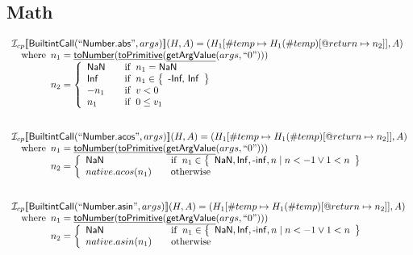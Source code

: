 \documentclass{article}
\newcommand{\SF}[1]{\mbox{\textsf{#1}}}
\newcommand{\wherec}[1]{{\rm where}\begin{array}[t]{l}#1\end{array}}
\newcommand{\ifc}[1]{{\rm if}\begin{array}[t]{l}#1\end{array}}
\newcommand{\owc}{{\rm otherwise}}
\newcommand{\I}{\mathcal{I}}
\newcommand{\set}[1]{\left\{\begin{array}{l}#1\end{array}\right\}}
\newcommand{\lbr}{\llbracket}
\newcommand{\rbr}{\rrbracket}
\newcommand{\hf}[1]{\underline{\sf #1}}
\begin{document}
\subsection{Math}
\[
\begin{array}{l}

\I _{cp}\lbr \SF{BuiltintCall}(``\SF{Number.abs}",args)\rbr(H,A)
  = (H_1[\#temp \mapsto H_1(\#temp)[@return \mapsto n_2]], A)\\
\quad\wherec{
  n_1 = \hf{toNumber}(\hf{toPrimitive}(\hf{getArgValue}(args, ``0")))\\
  n_2 = \left\{
    \begin{array}{l@{\quad\quad}l}
      \SF{NaN} & \ifc{n_1=\SF{NaN}} \\
      \SF{Inf} & \ifc{n_1\in\set{\SF{-Inf, Inf}}} \\
      -n_1 & \ifc{v<0} \\
      n_1 & \ifc{0\leq v_1} \\
    \end{array}
  \right.
  }\\
\\\\


\I _{cp}\lbr \SF{BuiltintCall}(``\SF{Number.acos}",args)\rbr(H,A)
  = (H_1[\#temp \mapsto H_1(\#temp)[@return \mapsto n_2]], A)\\
\quad\wherec{
  n_1 = \hf{toNumber}(\hf{toPrimitive}(\hf{getArgValue}(args, ``0")))\\
  n_2 = \left\{
    \begin{array}{l@{\quad\quad}l}
      \SF{NaN} & \ifc{n_1 \in \set{\SF{NaN}, \SF{Inf}, \SF{-inf}, n \mid n<-1 \lor 1<n}} \\
      native.acos(n_1) & \owc
    \end{array}
  \right.
  }\\
\\\\


\I _{cp}\lbr \SF{BuiltintCall}(``\SF{Number.asin}",args)\rbr(H,A)
  = (H_1[\#temp \mapsto H_1(\#temp)[@return \mapsto n_2]], A)\\
\quad\wherec{
  n_1 = \hf{toNumber}(\hf{toPrimitive}(\hf{getArgValue}(args, ``0")))\\
  n_2 = \left\{
    \begin{array}{l@{\quad\quad}l}
      \SF{NaN} & \ifc{n_1 \in \set{\SF{NaN}, \SF{Inf}, \SF{-inf}, n \mid n<-1 \lor 1<n}} \\
      native.asin(n_1) & \owc
    \end{array}
  \right.
  }\\
\\\\



\end{array}\]
\end{document}
